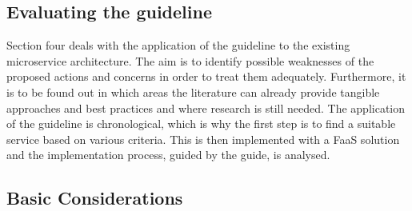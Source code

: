 \documentclass[a4paper,twoside,11pt, pagesize]{scrartcl}
\begin{document}
\begin{spacing}{1.2}
\section{Evaluating the guideline}
Section four deals with the application of the guideline to the existing microservice architecture. The aim is to identify possible weaknesses of the proposed actions and concerns in order to treat them adequately. Furthermore, it is to be found out in which areas the literature can already provide tangible approaches and best practices and where research is still needed. The application of the guideline is chronological, which is why the first step is to find a suitable service based on various criteria. This is then implemented with a FaaS solution and the implementation process, guided by the guide, is analysed.
\subsection{Basic Considerations}

\end{spacing}
\end{document}
